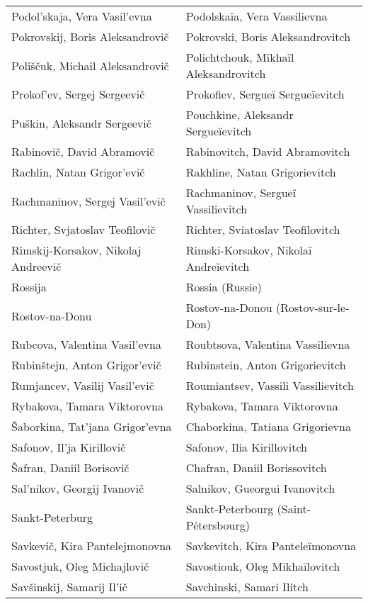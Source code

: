 {\begin{longtable}[c]{ll}
 \\
 Podol'skaja, Vera Vasil'evna
 & Podolskaïa, Vera Vassilievna
 \\
 Pokrovskij, Boris Aleksandrovič
 & Pokrovski, Boris Aleksandrovitch
 \\
 Poliščuk, Michail Aleksandrovič
 & Polichtchouk, Mikhaïl Aleksandrovitch
 \\
 Prokof'ev, Sergej Sergeevič
 & Prokofiev, Sergueï Sergueïevitch
 \\
 Puškin, Aleksandr Sergeevič
 & Pouchkine, Aleksandr Sergueïevitch
 \\
 Rabinovič, David Abramovič
 & Rabinovitch, David Abramovitch
 \\
 Rachlin, Natan Grigor'evič
 & Rakhline, Natan Grigorievitch
 \\
 Rachmaninov, Sergej Vasil'evič
 & Rachmaninov, Sergueï Vassilievitch
 \\
 Richter, Svjatoslav Teofilovič
 & Richter, Sviatoslav Teofilovitch
 \\
 Rimskij-Korsakov, Nikolaj Andreevič
 & Rimski-Korsakov, Nikolaï Andreïevitch
 \\
 Rossija
 & Rossia (Russie)
 \\
 Rostov-na-Donu
 & Rostov-na-Donou (Rostov-sur-le-Don)
 \\
 Rubcova, Valentina Vasil'evna
 & Roubtsova, Valentina Vassilievna
 \\
 Rubinštejn, Anton Grigor'evič
 & Rubinstein, Anton Grigorievitch
 \\
 Rumjancev, Vasilij Vasil'evič
 & Roumiantsev, Vassili Vassilievitch
 \\
 Rybakova, Tamara Viktorovna
 & Rybakova, Tamara Viktorovna
 \\
 Šaborkina, Tat'jana Grigor'evna
 & Chaborkina, Tatiana Grigorievna
 \\
 Safonov, Il'ja Kirillovič
 & Safonov, Ilia Kirillovitch
 \\
 Šafran, Daniil Borisovič
 & Chafran, Daniil Borissovitch
 \\
 Sal'nikov, Georgij Ivanovič
 & Salnikov, Gueorgui Ivanovitch
 \\
 Sankt-Peterburg
 & Sankt-Peterbourg (Saint-Pétersbourg)
 \\
 Savkevič, Kira Pantelejmonovna
 & Savkevitch, Kira Panteleïmonovna
 \\
 Savostjuk, Oleg Michajlovič
 & Savostiouk, Oleg Mikhaïlovitch
 \\
 Savšinskij, Samarij Il'ič
 & Savchinski, Samari Ilitch
 \\

\end{longtable}}
